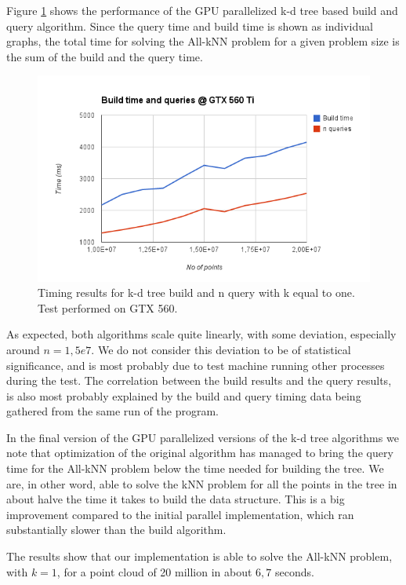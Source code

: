 Figure \ref{fig:v17-gtx-560} shows the performance of the GPU parallelized k-d tree based build and query algorithm. Since the query time and build time is shown as individual graphs, the total time for solving the All-kNN problem for a given problem size is the sum of the build and the query time.

\begin{figure}[ht!]
    \centering
    \includegraphics[width=120mm]{../gfx/v17-gtx-560.png}
    \caption{Timing results for k-d tree build and n query with k equal to one. Test performed on GTX 560.}
    \label{fig:v17-gtx-560}
\end{figure}

As expected, both algorithms scale quite linearly, with some deviation, especially around $n=1,5e7$. We do not consider this deviation to be of statistical significance, and is most probably due to test machine running other processes during the test. The correlation between the build results and the query results, is also most probably explained by the build and query timing data being gathered from the same run of the program.

In the final version of the GPU parallelized versions of the k-d tree algorithms we note that optimization of the original algorithm has managed to bring the query time for the All-kNN problem below the time needed for building the tree. We are, in other word, able to solve the kNN problem for all the points in the tree in about halve the time it takes to build the data structure. This is a big improvement compared to the initial parallel implementation, which ran substantially slower than the build algorithm.

The results show that our implementation is able to solve the All-kNN problem, with $k=1$, for a point cloud of 20 million in about $6,7$ seconds.


